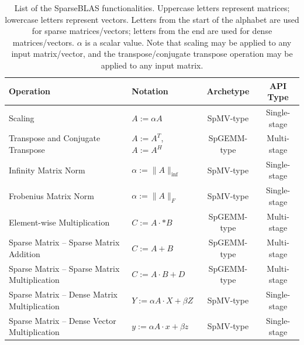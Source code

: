 \documentclass[manuscript,review]{acmart}
\begin{document}
\begin{table}[htbp]
  \centering
  \caption{List of the SparseBLAS functionalities. Uppercase letters represent matrices; lowercase letters represent vectors. Letters from the start of the alphabet are used for sparse matrices/vectors; letters from the end are used for dense matrices/vectors. $\alpha$ is a scalar value. Note that scaling may be applied to any input matrix/vector, and the transpose/conjugate transpose operation may be applied to any input matrix.}
  \label{tab:scope}
  \begin{tabularx}{\linewidth}{X >{\centering\arraybackslash}p{3.8cm} c c}
    \toprule
    \textbf{Operation} & \textbf{Notation} & \textbf{Archetype} & \textbf{API Type} \\
    \midrule
    Scaling & $A := \alpha A$ & SpMV-type & Single-stage \\
    Transpose and Conjugate Transpose & $A := A^T$, $A := A^H$ & SpGEMM-type & Multi-stage \\
    Infinity Matrix Norm & $\alpha := \|A\|_\text{inf}$ & SpMV-type & Single-stage \\
    Frobenius Matrix Norm & $\alpha := \|A\|_F$ & SpMV-type & Single-stage \\
    Element-wise Multiplication & $C := A \cdot* B$ & SpGEMM-type & Multi-stage \\
    Sparse Matrix -- Sparse Matrix Addition & $C := A + B$ & SpGEMM-type & Multi-stage \\
    Sparse Matrix -- Sparse Matrix Multiplication & $C := A \cdot B + D$ & SpGEMM-type & Multi-stage \\
    Sparse Matrix -- Dense Matrix Multiplication & $Y := \alpha A \cdot X + \beta Z$ & SpMV-type & Single-stage \\
    Sparse Matrix -- Dense Vector Multiplication & $y := \alpha A \cdot x + \beta z$ & SpMV-type & Single-stage \\

\end{tabularx}
\end{table}
\end{document}
